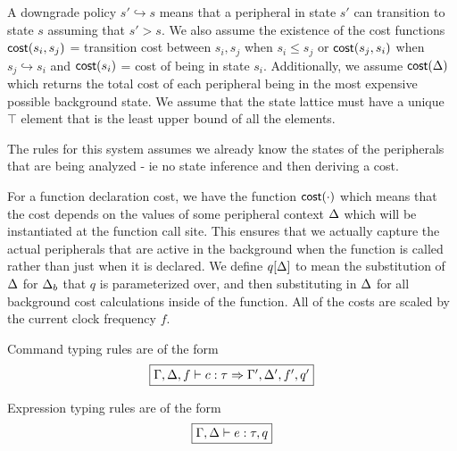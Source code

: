 A downgrade policy $s' \hookrightarrow s$ means that a peripheral in state $s'$ can transition to state $s$ assuming that $s' > s$. 
We also assume the existence of the cost functions 
$\mathsf{cost}(s_{i},s_{j})$ = transition cost between \(s_{i},s_{j}\) when \(s_{i} \leq s_{j}\) or $\mathsf{cost}(s_j, s_i)$ when \(s_j \hookrightarrow s_i\) and $\mathsf{cost}(s_{i})$ = cost of being in state \(s_{i}\). Additionally, we assume $\mathsf{cost}(\Delta)$ which returns the total cost of each peripheral being in the most expensive possible background state. 
We assume that the state lattice must have a unique \(\top\) element that is
the least upper bound of all the elements. 

The rules for this system assumes we already know the states of the peripherals that are being analyzed - ie no state inference and then deriving a cost.

For a function declaration cost, we have the function $\mathsf{cost}(\cdot)$ which means that the cost depends on the values of some peripheral context $\Delta$ which will be instantiated at the function call site. This ensures that we actually capture the actual peripherals that are active in the background when the function is called rather than just when it is declared. We define $q[\Delta]$ to mean the substitution of $\Delta$ for $\Delta_b$ that $q$ is parameterized over, and then substituting in $\Delta$ for all background cost calculations inside of the function. All of the costs are scaled by the current clock frequency $f$. 

Command typing rules are of the form $$
\begin{aligned}
    \fbox{$\Gamma, \Delta, f \vdash c: \tau \Rightarrow \Gamma', \Delta', f', q'$}
\end{aligned}
$$

Expression typing rules are of the form $$
\begin{aligned}
    \fbox{$\Gamma, \Delta \vdash e: \tau, q $}
\end{aligned}
$$

